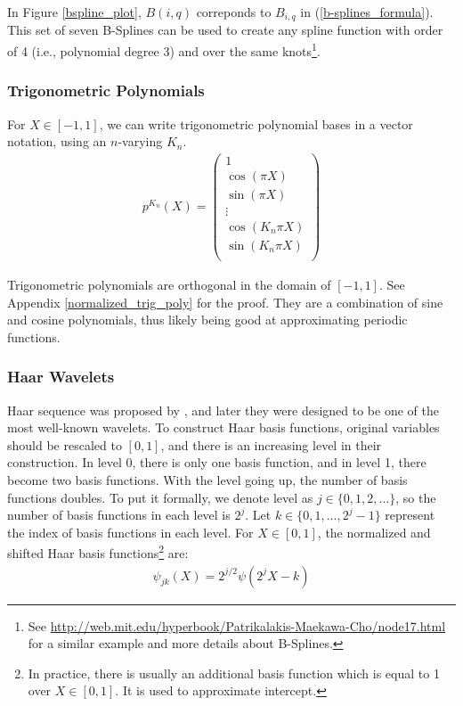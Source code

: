 \documentclass[12pt, a4paper]{article}
\theoremstyle{MAstyle} \newtheorem{assumption}{Assumption}[section]
\theoremstyle{MAstyle} \newtheorem{definition}{Definition}[section]
\theoremstyle{MAstyle} \newtheorem{theorem}{Theorem}[section]
\theoremstyle{MAstyle} \newtheorem{corollary}{Corollary}[section]
\begin{document}
        In Figure \ref{bspline_plot}, $B(i,q)$ correponds to $B_{i,q}$ in (\ref{b-splines_formula}). This set of seven B-Splines can be used to create any spline function with order of 4 (i.e., polynomial degree 3) and over the same knots\footnote{See \url{http://web.mit.edu/hyperbook/Patrikalakis-Maekawa-Cho/node17.html} for a similar example and more details about B-Splines.}. 

        \subsubsection{Trigonometric Polynomials}\label{trig_poly}

        For $X \in [-1,1]$, we can write trigonometric polynomial bases in a vector notation, using an $n$-varying $K_n$.
        \begin{align}
            p^{K_n}(X)=
            \begin{pmatrix}
                1  \\
                \cos(\pi X)  \\
                \sin(\pi X) \\
                \vdots \\
                \cos(K_n \pi X)  \\
                \sin(K_n \pi X) \\
            \end{pmatrix} 
        \end{align}

        Trigonometric polynomials are orthogonal in the domain of $[-1,1]$. See Appendix \ref{normalized_trig_poly} for the proof. They are a combination of sine and cosine polynomials, thus likely being good at approximating periodic functions.

        \subsubsection{Haar Wavelets}\label{haar_wavelets}

        Haar sequence was proposed by \cite{Haar_1910}, and later they were designed to be one of the most well-known wavelets. To construct Haar basis functions, original variables should be rescaled to $[0,1]$, and there is an increasing level in their construction. In level 0, there is only one basis function, and in level 1, there become two basis functions. With the level going up, the number of basis functions doubles. To put it formally, we denote level as $j \in \{0,1,2,\ldots\}$, so the number of basis functions in each level is $2^j$. Let $k \in \{0,1,\ldots, 2^j-1\}$ represent the index of basis functions in each level. For $X \in [0,1]$, the normalized and shifted Haar basis functions\footnote{In practice, there is usually an additional basis function which is equal to 1 over $X \in [0,1]$. It is used to approximate intercept.} are:
        \begin{align}
            \psi_{jk}(X)=2^{j/2}\psi(2^jX-k)
        \end{align}
\end{document}
